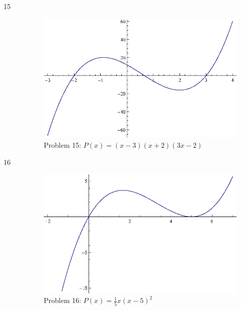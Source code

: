 \documentclass{exam}
\begin{document}
\begin{description}
    \item[15]
      \begin{figure}[H]
        \centering
        \includegraphics[scale=0.9]{problem15.eps}
        \caption*{Problem 15: $P(x) = (x - 3)(x + 2)(3x - 2)$}
      \end{figure}

    \item[16]
      \begin{figure}[H]
        \centering
        \includegraphics[scale=0.9]{problem16.eps}
        \caption*{Problem 16: $P(x) = \frac{1}{5} x (x - 5)^2$}
      \end{figure}


\end{description}
\end{document}
